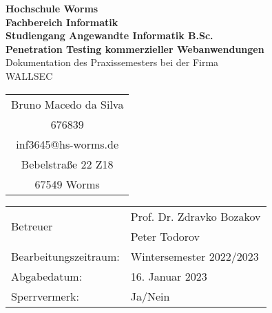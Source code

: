 \begin{titlepage}
    \vspace*{2mm}
    \begin{center}
        \Large
        \textbf{Hochschule Worms}\\
        \textbf{Fachbereich Informatik}\\
        \textbf{Studiengang Angewandte Informatik B.Sc.}\\
        \vspace{1cm}
        \textbf{Penetration Testing kommerzieller Webanwendungen}\\
        \vspace{1cm}
        \large
        Dokumentation des Praxissemesters bei der Firma\\
        \Large{WALLSEC}
        \vspace{2cm}
        \begin {table}[ht]
        \centering
            \begin{tabular}{c}
                Bruno Macedo da Silva  \\ 
                676839                \\
                inf3645@hs-worms.de   \\
                Bebelstraße 22 Z18    \\
                67549 Worms            \\
            \end{tabular}
        \end {table}
        \vspace{2cm}
        \large
        \vspace{1cm}
        \begin{table}[h]
            \centering
            \begin{tabular}{l l}
                \multirow{2}{*}{Betreuer}         & Prof. Dr. Zdravko Bozakov \\
                                                  & Peter Todorov \\
                Bearbeitungszeitraum:    & Wintersemester 2022/2023 \\
                Abgabedatum:          & 16. Januar 2023 \\
                Sperrvermerk: & Ja/Nein \\
            \end{tabular}
        \end{table}    
    \end{center}
    \normalsize
    \vfill
\end{titlepage}